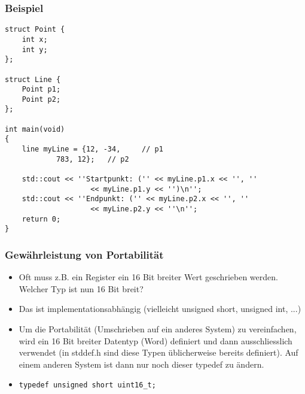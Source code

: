 \subsubsection{Beispiel\hfill}
\label{sec:unterunterabschnitt}
\noindent
\begin{minipage}{\linewidth}
\begin{lstlisting}
struct Point {
	int x;
	int y;
};

struct Line {
	Point p1;
	Point p2;
};

int main(void)
{
	line myLine = {12, -34,		// p1
			783, 12};	// p2
		
	std::cout << ''Startpunkt: ('' << myLine.p1.x << '', ''
					<< myLine.p1.y << '')\n'';
	std::cout << ''Endpunkt: ('' << myLine.p2.x << '', ''
					<< myLine.p2.y << ''\n'';
	return 0;
}
\end{lstlisting}
\end{minipage}

\subsubsection{Gewährleistung von Portabilität\hfill}
\label{sec:unterunterabschnitt}
\begin{itemize}
	\item Oft muss z.B. ein Register ein 16 Bit breiter Wert geschrieben werden. Welcher Typ ist nun 16 Bit breit?
	\item Das ist implementationsabhängig (vielleicht unsigned short, unsigned int, ...)
	\item Um die Portabilität (Umschrieben auf ein anderes System) zu vereinfachen, wird ein 16 Bit breiter Datentyp (Word) definiert und dann ausschliesslich verwendet (in stddef.h sind diese Typen üblicherweise bereits definiert). Auf einem anderen System ist dann nur noch dieser typedef zu ändern.
	\item[\-] 
\noindent
\begin{minipage}{\linewidth}
\begin{lstlisting}
typedef unsigned short uint16_t;
\end{lstlisting}
\end{minipage}
\end{itemize}

